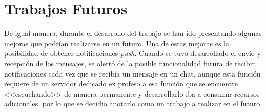 \clearpage

\section{Trabajos Futuros}
De igual manera, durante el desarrollo del trabajo se han ido presentando algunas mejoras que podrían realizarse en un futuro. Una de estas mejoras es la posibilidad de obtener notificaciones \textit{push}. Cuando se tuvo desarrollado el envío y recepción de los mensajes, se alertó de la posible funcionalidad futura de recibir notificaciones cada vez que se recibía un mensaje en un chat, aunque esta función requiere de un servidor dedicado ex profeso a esa función que se encuentre <<escuchando>> de manera permanente y desarrollarlo iba a consumir recursos adicionales, por lo que se decidió anotarlo como un trabajo a realizar en el futuro.